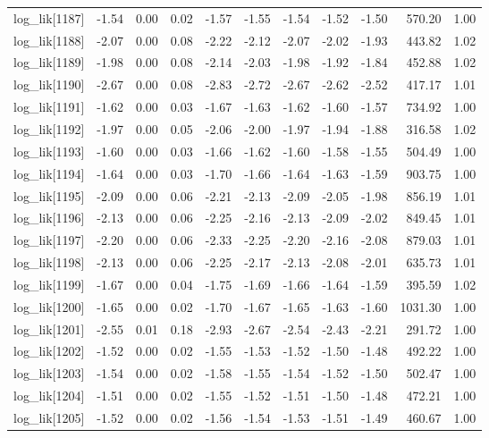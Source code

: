 \begin{table}[ht]
\begin{tabular}{rrrrrrrrrrr}
  log\_lik[1187] & -1.54 & 0.00 & 0.02 & -1.57 & -1.55 & -1.54 & -1.52 & -1.50 & 570.20 & 1.00 \\ 
  log\_lik[1188] & -2.07 & 0.00 & 0.08 & -2.22 & -2.12 & -2.07 & -2.02 & -1.93 & 443.82 & 1.02 \\ 
  log\_lik[1189] & -1.98 & 0.00 & 0.08 & -2.14 & -2.03 & -1.98 & -1.92 & -1.84 & 452.88 & 1.02 \\ 
  log\_lik[1190] & -2.67 & 0.00 & 0.08 & -2.83 & -2.72 & -2.67 & -2.62 & -2.52 & 417.17 & 1.01 \\ 
  log\_lik[1191] & -1.62 & 0.00 & 0.03 & -1.67 & -1.63 & -1.62 & -1.60 & -1.57 & 734.92 & 1.00 \\ 
  log\_lik[1192] & -1.97 & 0.00 & 0.05 & -2.06 & -2.00 & -1.97 & -1.94 & -1.88 & 316.58 & 1.02 \\ 
  log\_lik[1193] & -1.60 & 0.00 & 0.03 & -1.66 & -1.62 & -1.60 & -1.58 & -1.55 & 504.49 & 1.00 \\ 
  log\_lik[1194] & -1.64 & 0.00 & 0.03 & -1.70 & -1.66 & -1.64 & -1.63 & -1.59 & 903.75 & 1.00 \\ 
  log\_lik[1195] & -2.09 & 0.00 & 0.06 & -2.21 & -2.13 & -2.09 & -2.05 & -1.98 & 856.19 & 1.01 \\ 
  log\_lik[1196] & -2.13 & 0.00 & 0.06 & -2.25 & -2.16 & -2.13 & -2.09 & -2.02 & 849.45 & 1.01 \\ 
  log\_lik[1197] & -2.20 & 0.00 & 0.06 & -2.33 & -2.25 & -2.20 & -2.16 & -2.08 & 879.03 & 1.01 \\ 
  log\_lik[1198] & -2.13 & 0.00 & 0.06 & -2.25 & -2.17 & -2.13 & -2.08 & -2.01 & 635.73 & 1.01 \\ 
  log\_lik[1199] & -1.67 & 0.00 & 0.04 & -1.75 & -1.69 & -1.66 & -1.64 & -1.59 & 395.59 & 1.02 \\ 
  log\_lik[1200] & -1.65 & 0.00 & 0.02 & -1.70 & -1.67 & -1.65 & -1.63 & -1.60 & 1031.30 & 1.00 \\ 
  log\_lik[1201] & -2.55 & 0.01 & 0.18 & -2.93 & -2.67 & -2.54 & -2.43 & -2.21 & 291.72 & 1.00 \\ 
  log\_lik[1202] & -1.52 & 0.00 & 0.02 & -1.55 & -1.53 & -1.52 & -1.50 & -1.48 & 492.22 & 1.00 \\ 
  log\_lik[1203] & -1.54 & 0.00 & 0.02 & -1.58 & -1.55 & -1.54 & -1.52 & -1.50 & 502.47 & 1.00 \\ 
  log\_lik[1204] & -1.51 & 0.00 & 0.02 & -1.55 & -1.52 & -1.51 & -1.50 & -1.48 & 472.21 & 1.00 \\ 
  log\_lik[1205] & -1.52 & 0.00 & 0.02 & -1.56 & -1.54 & -1.53 & -1.51 & -1.49 & 460.67 & 1.00 \\ 

\end{tabular}
\end{table}
